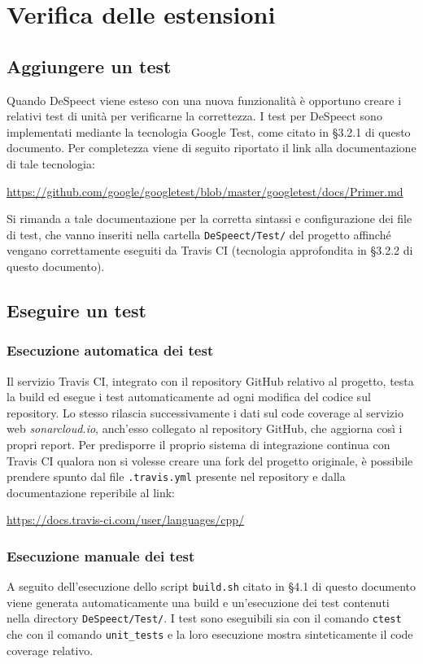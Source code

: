 \documentclass[openany,12pt,a4paper]{report}
\begin{document}
	\chapter{Verifica delle estensioni}
	
	\section{Aggiungere un test}
	
	Quando DeSpeect viene esteso con una nuova funzionalità è opportuno creare i relativi test di unità per verificarne la correttezza. I test per DeSpeect sono implementati mediante la tecnologia Google Test, come citato in §3.2.1 di questo documento. Per completezza viene di seguito riportato il link alla documentazione di tale tecnologia:
	\begin{center}
		\url{https://github.com/google/googletest/blob/master/googletest/docs/Primer.md}
	\end{center}
	Si rimanda a tale documentazione per la corretta sintassi e configurazione dei file di test, che vanno inseriti nella cartella \verb|DeSpeect/Test/| del progetto affinché vengano correttamente eseguiti da Travis CI (tecnologia approfondita in §3.2.2 di questo documento). 
	
	\section{Eseguire un test}
	
	\subsection{Esecuzione automatica dei test}
	Il servizio Travis CI, integrato con il repository GitHub relativo al progetto, testa la build ed esegue i test automaticamente ad ogni modifica del codice sul repository. Lo stesso rilascia successivamente i dati sul code coverage al servizio web \textit{sonarcloud.io}, anch'esso collegato al repository GitHub, che aggiorna così i propri report. Per predisporre il proprio sistema di integrazione continua con Travis CI qualora non si volesse creare una fork del progetto originale, è possibile prendere spunto dal file \verb|.travis.yml| presente nel repository e dalla documentazione reperibile al link:
	\begin{center}
		\url{https://docs.travis-ci.com/user/languages/cpp/}
	\end{center}
	
	\subsection{Esecuzione manuale dei test}
	A seguito dell'esecuzione dello script \verb|build.sh| citato in §4.1 di questo documento viene generata automaticamente una build e un'esecuzione dei test contenuti nella directory \verb|DeSpeect/Test/|. I test sono eseguibili sia con il comando \verb|ctest| che con il comando \verb|unit_tests| e la loro esecuzione mostra sinteticamente il code coverage relativo. 
	
\end{document}
